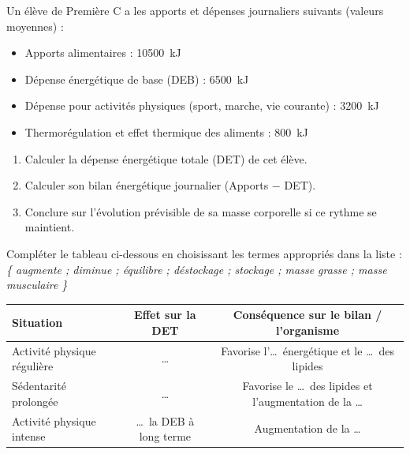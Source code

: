 \documentclass[11pt]{article}
\begin{document}
\begin{exercice}
Un élève de Première C a les apports et dépenses journaliers suivants (valeurs moyennes) :
\begin{itemize}
    \item Apports alimentaires : \SI{10500}{\kilo\joule}
    \item Dépense énergétique de base (DEB) : \SI{6500}{\kilo\joule}
    \item Dépense pour activités physiques (sport, marche, vie courante) : \SI{3200}{\kilo\joule}
    \item Thermorégulation et effet thermique des aliments : \SI{800}{\kilo\joule}
\end{itemize}
\begin{enumerate}
    \item Calculer la dépense énergétique totale (DET) de cet élève.
    \item Calculer son bilan énergétique journalier (Apports $-$ DET).
    \item Conclure sur l'évolution prévisible de sa masse corporelle si ce rythme se maintient.
\end{enumerate}
\end{exercice}

\begin{exercice}
Compléter le tableau ci-dessous en choisissant les termes appropriés dans la liste :
\textit{\{ augmente ; diminue ; équilibre ; déstockage ; stockage ; masse grasse ; masse musculaire \}}
\begin{center}
\begin{tabular}{|l|c|c|}
\hline
\textbf{Situation} & \textbf{Effet sur la DET} & \textbf{Conséquence sur le bilan / l'organisme} \\ \hline
Activité physique régulière & \dots & Favorise l'\dots\ énergétique et le \dots\ des lipides \\ \hline
Sédentarité prolongée & \dots & Favorise le \dots\ des lipides et l'augmentation de la \dots \\ \hline
Activité physique intense & \dots\ la DEB à long terme & Augmentation de la \dots \\ \hline
\end{tabular}
\end{center}
\end{exercice}
\end{document}
